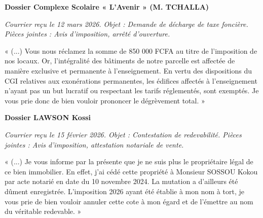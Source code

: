 \documentclass[a4paper, 11pt]{exam}
\begin{document}
\begin{questions}
		\question \textbf{Dossier Complexe Scolaire « L'Avenir » (M. TCHALLA)}
		
		\textit{Courrier reçu le 12 mars 2026. Objet : Demande de décharge de taxe foncière. Pièces jointes : Avis d'imposition, arrêté d'ouverture.}
		
		« (...) Vous nous réclamez la somme de 850 000 FCFA au titre de l'imposition de nos locaux. Or, l'intégralité des bâtiments de notre parcelle est affectée de manière exclusive et permanente à l'enseignement. En vertu des dispositions du CGI relatives aux exonérations permanentes, les édifices affectés à l'enseignement n'ayant pas un but lucratif ou respectant les tarifs réglementés, sont exemptés. Je vous prie donc de bien vouloir prononcer le dégrèvement total. »
		
		
		\vspace{0.5cm}
		
		\question \textbf{Dossier LAWSON Kossi}
		
		\textit{Courrier reçu le 15 février 2026. Objet : Contestation de redevabilité. Pièces jointes : Avis d'imposition, attestation notariale de vente.}
		
		« (...) Je vous informe par la présente que je ne suis plus le propriétaire légal de ce bien immobilier. En effet, j'ai cédé cette propriété à Monsieur SOSSOU Kokou par acte notarié en date du 10 novembre 2024. La mutation a d'ailleurs été dûment enregistrée. L'imposition 2026 ayant été établie à mon nom à tort, je vous prie de bien vouloir annuler cette cote à mon égard et de l'émettre au nom du véritable redevable. »
		

\end{questions}
\end{document}
